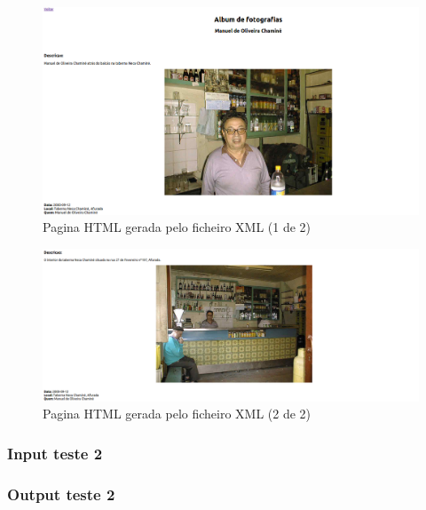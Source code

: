 \label{seq:anex-museu-test-out01-02}


\begin{figure}[H]
\centering
\includegraphics[width=15cm]{anexos/2-1/Exemplo1/Screenshots/pag1.png}
\caption{Pagina HTML gerada pelo ficheiro XML (1 de 2)}
\end{figure}

\begin{figure}[H]
\centering
\includegraphics[width=15cm]{anexos/2-1/Exemplo1/Screenshots/pag2.png}
\caption{Pagina HTML gerada pelo ficheiro XML (2 de 2)}
\end{figure}

\subsubsection{Input teste 2}
\label{seq:anex-museu-test-in02}


\subsubsection{Output teste 2}
\label{seq:anex-museu-test-out02-01}


